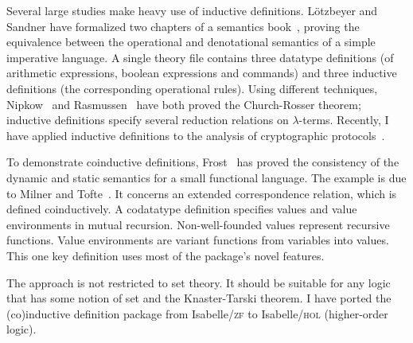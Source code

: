 \documentclass[12pt,a4paper]{article}
\begin{document}
Several large studies make heavy use of inductive definitions.  L\"otzbeyer
and Sandner have formalized two chapters of a semantics book~\cite{winskel93},
proving the equivalence between the operational and denotational semantics of
a simple imperative language.  A single theory file contains three datatype
definitions (of arithmetic expressions, boolean expressions and commands) and
three inductive definitions (the corresponding operational rules).  Using
different techniques, Nipkow~\cite{nipkow-CR} and Rasmussen~\cite{rasmussen95}
have both proved the Church-Rosser theorem; inductive definitions specify
several reduction relations on $\lambda$-terms.  Recently, I have applied
inductive definitions to the analysis of cryptographic
protocols~\cite{paulson-markt}. 

To demonstrate coinductive definitions, Frost~\cite{frost95} has proved the
consistency of the dynamic and static semantics for a small functional
language.  The example is due to Milner and Tofte~\cite{milner-coind}.  It
concerns an extended correspondence relation, which is defined coinductively.
A codatatype definition specifies values and value environments in mutual
recursion.  Non-well-founded values represent recursive functions.  Value
environments are variant functions from variables into values.  This one key
definition uses most of the package's novel features.

The approach is not restricted to set theory.  It should be suitable for any
logic that has some notion of set and the Knaster-Tarski theorem.  I have
ported the (co)inductive definition package from Isabelle/\textsc{zf} to
Isabelle/\textsc{hol} (higher-order logic).  


\begin{footnotesize}


\end{footnotesize}
\end{document}
